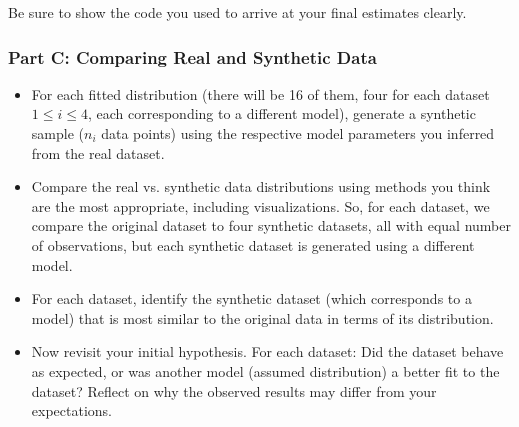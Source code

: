 \documentclass[11pt]{article}
\begin{document}
Be sure to show the code you used to arrive at your final estimates clearly.

\subsubsection*{Part C: Comparing Real and Synthetic Data}

\begin{itemize}
    \item For each fitted distribution (there will be 16 of them, four for each dataset $1\leq i\leq 4$, each corresponding to a different model), generate a synthetic sample ($n_i$ data points) using the respective model parameters you inferred from the real dataset. 
    \item Compare the real vs. synthetic data distributions using methods you think are the most appropriate, including visualizations. So, for each dataset, we compare the original dataset to four synthetic datasets, all with equal number of observations, but each synthetic dataset is generated using a different model.
    \item For each dataset, identify the synthetic dataset (which corresponds to a model) that is most similar to the original data in terms of its distribution.
    \item Now revisit your initial hypothesis. For each dataset: Did the dataset behave as expected, or was another model (assumed distribution) a better fit to the dataset? Reflect on why the observed results may differ from your expectations.  
\end{itemize}
\end{document}
